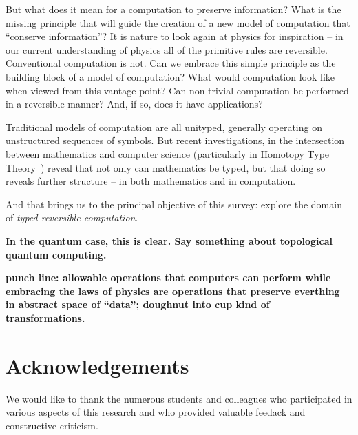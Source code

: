 \documentclass{article}
\newcommand{\amr}[1]{\fbox{Amr says:} \textbf{#1}}
\begin{document}
But what does it mean for a computation to preserve information?
What is the missing principle that will guide the creation of a new
model of computation that ``conserve information''?
It is nature to look again at physics for inspiration --
in our current understanding of physics all of the primitive rules
are reversible. Conventional computation is not. Can
we embrace this simple principle as the building block of a model of
computation? What would computation look like when viewed from this
vantage point? Can non-trivial computation be performed in a
reversible manner? And, if so, does it have applications?

Traditional models of computation are all unityped, generally
operating on unstructured sequences of symbols. But recent
investigations, in the intersection between mathematics and
computer science (particularly in Homotopy Type Theory~\cite{hottbook})
reveal that not only can mathematics be typed, but that doing so
reveals further structure -- in both mathematics and in computation.

And that brings us to the principal objective of this survey: explore the
domain of \emph{typed reversible computation}.

\amr{In the quantum case, this is clear. Say something about topological
quantum computing.}

\textbf{punch line: allowable operations that computers can perform
  while embracing the laws of physics are operations that preserve
  everthing in abstract space of ``data''; doughnut into cup kind of
  transformations.}

\section*{Acknowledgements} We would like to thank the numerous
students and colleagues who participated in various aspects of this
research and who provided valuable feedack and constructive criticism.



\end{document}
